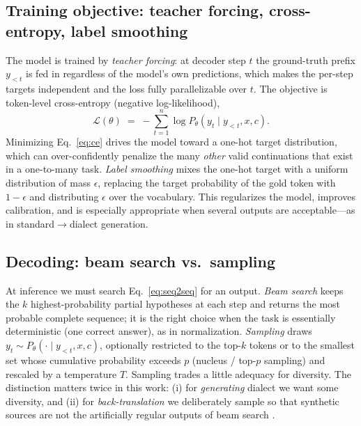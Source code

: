 \documentclass[11pt]{article}
\begin{document}
\subsection{Training objective: teacher forcing, cross-entropy, label smoothing}
\label{sec:bg-train}

The model is trained by \emph{teacher forcing}: at decoder step $t$ the
ground-truth prefix $y_{<t}$ is fed in regardless of the model's own predictions,
which makes the per-step targets independent and the loss fully parallelizable
over $t$. The objective is token-level cross-entropy (negative log-likelihood),
\begin{equation}
  \mathcal{L}(\theta) \;=\; -\sum_{t=1}^{n} \log P_\theta\!\left(y_t \mid y_{<t}, x, c\right).
  \label{eq:ce}
\end{equation}
Minimizing Eq.~\ref{eq:ce} drives the model toward a one-hot target distribution,
which can over-confidently penalize the many \emph{other} valid continuations
that exist in a one-to-many task. \emph{Label smoothing}
\citep{szegedy2016labelsmoothing} mixes the one-hot target with a uniform
distribution of mass $\epsilon$, replacing the target probability of the gold
token with $1-\epsilon$ and distributing $\epsilon$ over the vocabulary. This
regularizes the model, improves calibration, and is especially appropriate when
several outputs are acceptable---as in standard$\rightarrow$dialect generation.

\subsection{Decoding: beam search vs.\ sampling}
\label{sec:bg-decode}

At inference we must search Eq.~\ref{eq:seq2seq} for an output. \emph{Beam
search} keeps the $k$ highest-probability partial hypotheses at each step and
returns the most probable complete sequence; it is the right choice when the task
is essentially deterministic (one correct answer), as in normalization.
\emph{Sampling} draws $y_t \sim P_\theta(\cdot \mid y_{<t}, x, c)$, optionally
restricted to the top-$k$ tokens or to the smallest set whose cumulative
probability exceeds $p$ (nucleus / top-$p$ sampling) and rescaled by a temperature
$T$. Sampling trades a little adequacy for diversity. The distinction matters
twice in this work: (i) for \emph{generating} dialect we want some diversity, and
(ii) for \emph{back-translation} we deliberately sample so that synthetic sources
are not the artificially regular outputs of beam search
\citep{edunov2018understanding}.
\end{document}
